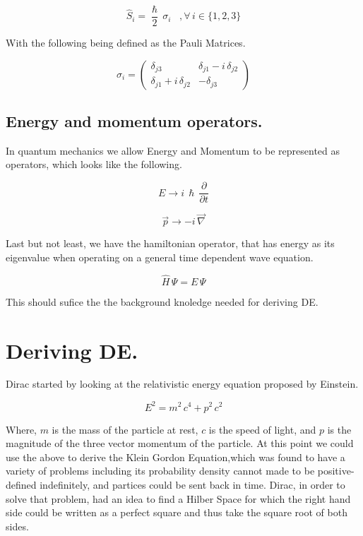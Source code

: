 \documentclass[a4page,12pt]{article}
\begin{document}
			\[\hat{S}_i = \frac{\hslash }{2} \, \sigma_i \;\;\; ,\forall \, i \in \{1,2,3\}\]

			With the following being defined as the Pauli Matrices.

			\[
				\sigma_i = 
				\begin{pmatrix}
					\delta_{j3} & \delta_{j1} - i \,\delta_{j2} \\
					\delta_{j1} + i \,\delta_{j2} & -\delta_{j3}
				\end{pmatrix}
			\]
\vspace{0.5cm}
		\subsection{Energy and momentum operators.}

			In quantum mechanics we allow Energy and Momentum to be represented as operators, which looks like the following.

			\[
				E \to i \, \hslash \, \frac{\partial}{\partial t}
			\]

			\[
				\vec{p} \to -i \,\vec{\nabla}
			\]
			
			Last but not least, we have the hamiltonian operator, that has energy as its eigenvalue when operating on a general time dependent wave equation.

			\[
				\hat{H} \, \Psi = E \, \Psi 
			\]

			This should sufice the the background knoledge needed for deriving DE.

\section{Deriving DE.}

	Dirac started by looking at the relativistic energy equation proposed by Einstein. 

		\[
			E^2 = m^2 \, c^4 + p^2 \, c^2
		\]

	Where, $m$ is the mass of the particle at rest, $c$ is the speed of light, and $p$ is the magnitude of the three vector momentum of the particle. At this point we could use the above to derive the Klein Gordon Equation,which was found to have a variety of problems including its probability density cannot made to be positive-defined indefinitely, and partices could be sent back in time. Dirac, in order to solve that problem, had an idea to find a Hilber Space for which the right hand side could be written as a perfect square and thus take the square root of both sides.
\end{document}
